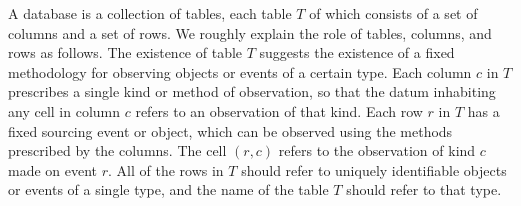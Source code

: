 \documentclass[CT4S-EN-RU]{subfiles}
\begin{document}
\begin{blockENG}
A database is a collection of tables, each table $T$ of which consists of a set of columns and a set of rows. We roughly explain the role of tables, columns, and rows as follows. The existence of table $T$ suggests the existence of a fixed methodology for observing objects or events of a certain type. Each column $c$ in $T$ prescribes a single kind or method of observation, so that the datum inhabiting any cell in column $c$ refers to an observation of that kind. Each row $r$ in $T$ has a fixed sourcing event or object, which can be observed using the methods prescribed by the columns. The cell $(r,c)$ refers to the observation of kind $c$ made on event $r$. All of the rows in $T$ should refer to uniquely identifiable objects or events of a single type, and the name of the table $T$ should refer to that type.
\end{blockENG}

\begin{blockRUS}
\end{blockRUS}
\end{document}
